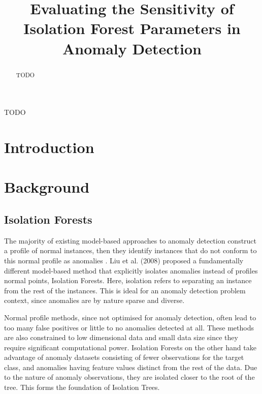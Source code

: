 \documentclass[10pt, conference]{IEEEtran}
\begin{document}
\title{Evaluating the Sensitivity of Isolation Forest Parameters in Anomaly Detection\\

}

\author{
}

\maketitle

\begin{abstract}
TODO
\end{abstract}

\begin{IEEEkeywords}
TODO
\end{IEEEkeywords}

\section{Introduction}


\section{Background}
\subsection{Isolation Forests}
The majority of existing model-based approaches to anomaly detection construct a profile of normal instances, then they identify instances that do not conform to this normal profile as anomalies \cite{iforest}. Liu et al. (2008) proposed a fundamentally different model-based method that explicitly isolates anomalies instead of profiles normal points, Isolation Forests. Here, isolation refers to separating an instance from the rest of the instances. This is ideal for an anomaly detection problem context, since anomalies are by nature sparse and diverse.

Normal profile methods, since not optimised for anomaly detection, often lead to too many false positives or little to no anomalies detected at all. These methods are also constrained to low dimensional data and small data size since they require significant computational power. Isolation Forests on the other hand take advantage of anomaly datasets consisting of fewer observations for the target class, and anomalies having feature values distinct from the rest of the data. Due to the nature of anomaly observations, they are isolated closer to the root of the tree. This forms the foundation of Isolation Trees.
\end{document}
